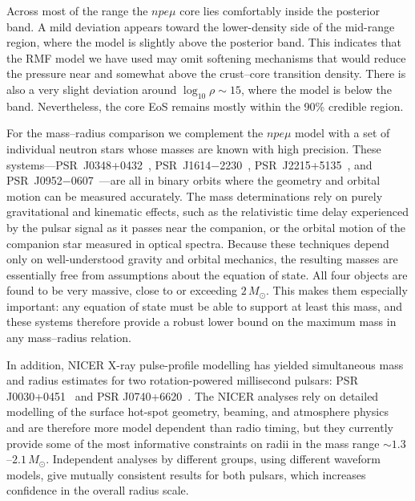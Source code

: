 Across most of the range the $npe\mu$ core lies comfortably inside the
posterior band. A mild deviation appears toward the lower-density side of the
mid-range region, where the model is slightly above the posterior band. 
This indicates that the RMF model we have used may omit softening mechanisms 
that would reduce the pressure near and somewhat above the crust--core 
transition density.
There is also a very slight deviation around $\log_{10}\rho \sim 15$, where the model
is below the band.
Nevertheless, the core EoS remains mostly within the 90\% credible region.

\smallskip

For the mass--radius comparison we complement the $npe\mu$ model with a set of 
individual neutron stars whose masses are known with high precision.  
These systems—PSR~J0348+0432~\cite{Antoniadis_2013_J0348},
PSR~J1614$-$2230~\cite{Demorest_2010_J1614},
PSR~J2215+5135~\cite{linares2018}, and
PSR~J0952$-$0607~\cite{romani2022}—are all in binary orbits where the 
geometry and orbital motion can be measured accurately.  
The mass determinations rely on purely gravitational and kinematic effects, such as 
the relativistic time delay experienced by the pulsar signal as it passes near the 
companion, or the orbital motion of the companion star measured in optical spectra.  
Because these techniques depend only on well-understood gravity and orbital 
mechanics, the resulting masses are essentially free from assumptions about the 
equation of state.  All four objects are found to be very massive, close to or 
exceeding \({2\,M_{\odot}}\).  
This makes them especially important: any equation of state must be able 
to support at least this mass, and these systems therefore provide a robust lower 
bound on the maximum mass in any mass--radius relation.

In addition, NICER X-ray pulse-profile modelling has yielded simultaneous
mass and radius estimates for two rotation-powered millisecond pulsars:
PSR J0030+0451~\cite{Miller_2019_J0030,Riley_2019_J0030} and
PSR J0740+6620~\cite{Miller_2021_J0740,Salmi_2024_J0740}.
The NICER analyses rely on detailed modelling of the surface hot-spot geometry,
beaming, and atmosphere physics and are therefore more model dependent than
radio timing, but they currently provide some of the most informative
constraints on radii in the mass range $\sim 1.3$--$2.1\,M_{\odot}$.
Independent analyses by different groups, using different waveform models,
give mutually consistent results for both pulsars, which increases confidence
in the overall radius scale.

